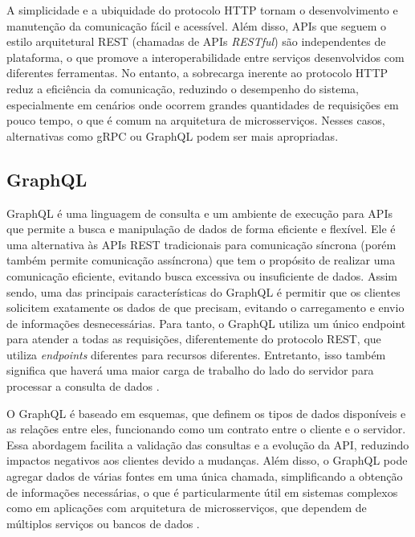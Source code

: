 A simplicidade e a ubiquidade do protocolo HTTP tornam o desenvolvimento e manutenção da comunicação fácil e acessível. Além disso, APIs que seguem o estilo arquitetural REST (chamadas de APIs \emph{RESTful}) são independentes de plataforma, o que promove a interoperabilidade entre serviços desenvolvidos com diferentes ferramentas. No entanto, a sobrecarga inerente ao protocolo HTTP reduz a eficiência da comunicação, reduzindo o desempenho do sistema, especialmente em cenários onde ocorrem grandes quantidades de requisições em pouco tempo, o que é comum na arquitetura de microsserviços. Nesses casos, alternativas como gRPC ou GraphQL podem ser mais apropriadas.

\subsection{GraphQL}

GraphQL é uma linguagem de consulta e um ambiente de execução para APIs que permite a busca e manipulação de dados de forma eficiente e flexível. Ele é uma alternativa às APIs REST tradicionais para comunicação síncrona (porém também permite comunicação assíncrona) que tem o propósito de realizar uma comunicação eficiente, evitando busca excessiva ou insuficiente de dados. Assim sendo, uma das principais características do GraphQL é permitir que os clientes solicitem exatamente os dados de que precisam, evitando o carregamento e envio de informações desnecessárias. Para tanto, o GraphQL utiliza um único endpoint para atender a todas as requisições, diferentemente do protocolo REST, que utiliza \emph{endpoints} diferentes para recursos diferentes. Entretanto, isso também significa que haverá uma maior carga de trabalho do lado do servidor para processar a consulta de dados \cite{graphql_redhat}.

O GraphQL é baseado em esquemas, que definem os tipos de dados disponíveis e as relações entre eles, funcionando como um contrato entre o cliente e o servidor. Essa abordagem facilita a validação das consultas e a evolução da API, reduzindo impactos negativos aos clientes devido a mudanças. Além disso, o GraphQL pode agregar dados de várias fontes em uma única chamada, simplificando a obtenção de informações necessárias, o que é particularmente útil em sistemas complexos como em aplicações com arquitetura de microsserviços, que dependem de múltiplos serviços ou bancos de dados \cite{graphql_redhat}.

